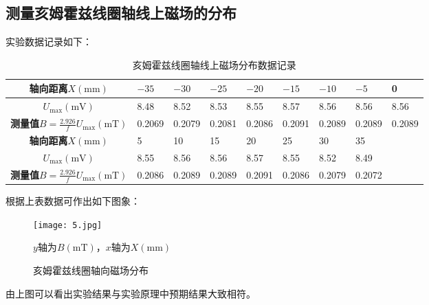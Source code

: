 \documentclass[UTF-8,twoside,cs4size]{ctexart}
\begin{document}
	\subsection{测量亥姆霍兹线圈轴线上磁场的分布}
	实验数据记录如下：
	\begin{table}[!h]
		\centering
		\renewcommand\arraystretch{1.5}
		\small
		\caption{亥姆霍兹线圈轴线上磁场分布数据记录}
		\begin{tabularx}{\textwidth}{|c|Y|Y|Y|Y|Y|Y|Y|Y|}
			\hline
			\textbf{轴向距离}$ X(\mathrm{mm}) $&$ -35 $&$ -30 $&$ -25 $&$ -20 $&$ -15 $&$ -10 $&$ -5 $&0\\
			\hline
			$ U_\max(\mathrm{mV}) $&8.48&8.52&8.53&8.55&8.57&8.56&8.56&8.56\\
			\hline
			\textbf{测量值}$ B=\frac{2.926}{f}U_\max(\mathrm{mT}) $&0.2069&0.2079&0.2081&0.2086&0.2091&0.2089&0.2089&0.2089\\
			\hline
			\textbf{轴向距离}$ X(\mathrm{mm}) $&5&10&15&20&25&30&35&\\
			\hline
			$ U_\max(\mathrm{mV}) $&8.55&8.56&8.56&8.57&8.55&8.52&8.49&\\
			\hline
			\textbf{测量值}$ B=\frac{2.926}{f}U_\max(\mathrm{mT}) $&0.2086&0.2089&0.2089&0.2091&0.2086&0.2079&0.2072&\\
			\hline
		\end{tabularx}
	\end{table}

	根据上表数据可作出如下图象：
	
	\begin{figure}[!h]
		\centering
		\texttt{[image: 5.jpg]}
		
		{\small$ y $轴为$ B(\mathrm{mT}) $，$ x $轴为$ X(\mathrm{mm}) $}
		
		\caption{亥姆霍兹线圈轴向磁场分布}
	\end{figure}
	由上图可以看出实验结果与实验原理中预期结果大致相符。
	
\end{document}
